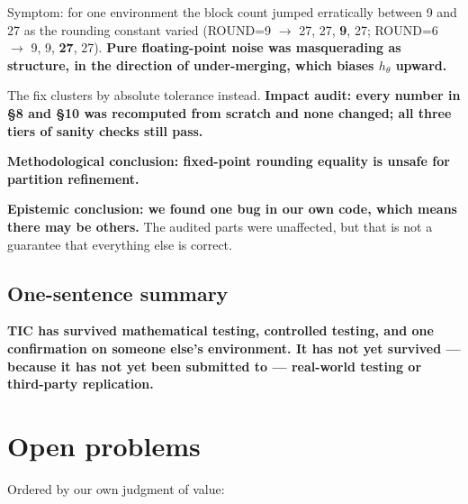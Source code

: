 \documentclass[11pt]{article}
\renewenvironment{quote}
  {\def\FrameCommand{{\color{gray!60}\vrule width 2pt}\hspace{8pt}}%
   \MakeFramed{\advance\hsize-\width \FrameRestore}\begin{itshape}}
  {\end{itshape}\endMakeFramed}
\begin{document}
Symptom: for one environment the block count jumped erratically between 9 and 27 as the rounding constant varied (ROUND=9 \(\rightarrow\) 27, 27, \textbf{9}, 27; ROUND=6 \(\rightarrow\) 9, 9, \textbf{27}, 27). \textbf{Pure floating-point noise was masquerading as structure, in the direction of under-merging, which biases \(h_\theta\) upward.}

The fix clusters by absolute tolerance instead. \textbf{Impact audit: every number in \S{}8 and \S{}10 was recomputed from scratch and none changed; all three tiers of sanity checks still pass.}

\begin{quote}
\textbf{Methodological conclusion: fixed-point rounding equality is unsafe for partition refinement.}

\textbf{Epistemic conclusion: we found one bug in our own code, which means there may be others.} The audited parts were unaffected, but that is not a guarantee that everything else is correct.
\end{quote}

\hypertarget{one-sentence-summary}{%
\subsection{One-sentence summary}\label{one-sentence-summary}}

\begin{quote}
\textbf{TIC has survived mathematical testing, controlled testing, and one confirmation on someone else's environment. It has not yet survived --- because it has not yet been submitted to --- real-world testing or third-party replication.}
\end{quote}

\hypertarget{open-problems}{%
\section{Open problems}\label{open-problems}}

Ordered by our own judgment of value:
\end{document}

